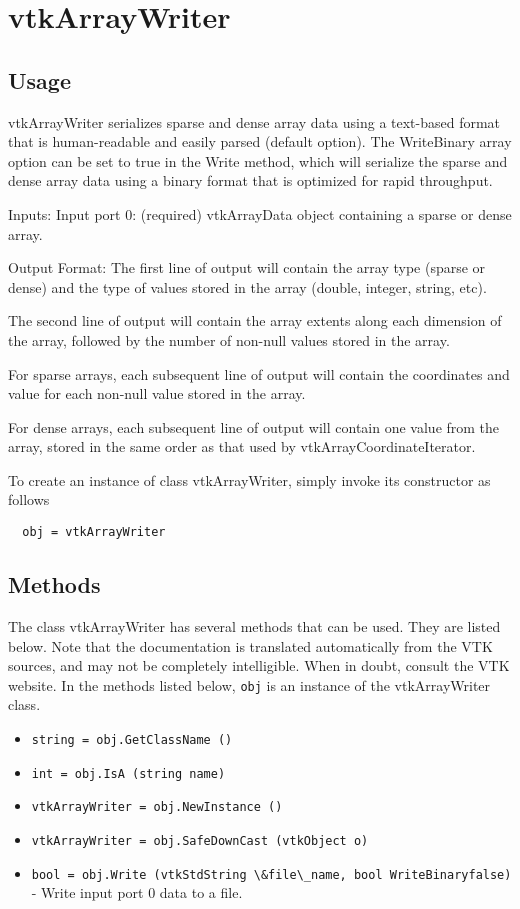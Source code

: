 \section{vtkArrayWriter}

\subsection{Usage}

 vtkArrayWriter serializes sparse and dense array data using a text-based
 format that is human-readable and easily parsed (default option).  The 
 WriteBinary array option can be set to true in the Write method, which 
 will serialize the sparse and dense array data using a binary format that 
 is optimized for rapid throughput.

 Inputs:
   Input port 0: (required) vtkArrayData object containing a sparse or dense array.

 Output Format:
   The first line of output will contain the array type (sparse or dense) and the
   type of values stored in the array (double, integer, string, etc).

   The second line of output will contain the array extents along each dimension
   of the array, followed by the number of non-null values stored in the array.

   For sparse arrays, each subsequent line of output will contain the coordinates
   and value for each non-null value stored in the array.

   For dense arrays, each subsequent line of output will contain one value from the
   array, stored in the same order as that used by vtkArrayCoordinateIterator.


To create an instance of class vtkArrayWriter, simply
invoke its constructor as follows
\begin{verbatim}
  obj = vtkArrayWriter
\end{verbatim}
\subsection{Methods}

The class vtkArrayWriter has several methods that can be used.
  They are listed below.
Note that the documentation is translated automatically from the VTK sources,
and may not be completely intelligible.  When in doubt, consult the VTK website.
In the methods listed below, \verb|obj| is an instance of the vtkArrayWriter class.
\begin{itemize}
\item  \verb|string = obj.GetClassName ()|

\item  \verb|int = obj.IsA (string name)|

\item  \verb|vtkArrayWriter = obj.NewInstance ()|

\item  \verb|vtkArrayWriter = obj.SafeDownCast (vtkObject o)|

\item  \verb|bool = obj.Write (vtkStdString \&file\_name, bool WriteBinaryfalse)| -  Write input port 0 data to a file.

\end{itemize}
